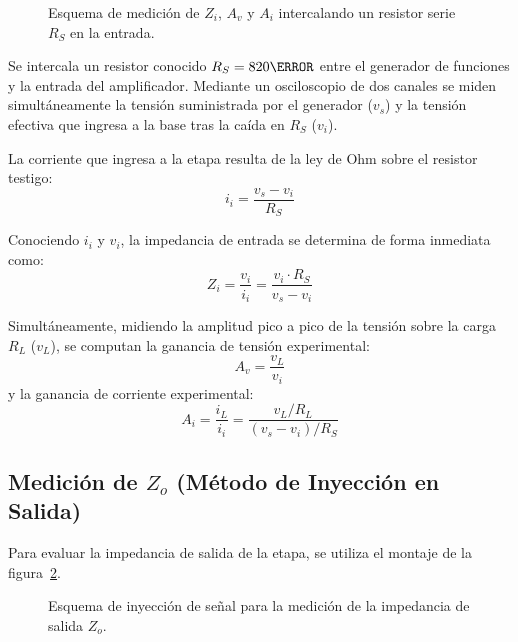 \begin{figure}[!ht]
  \centering
  
  \caption{Esquema de medición de $Z_i$, $A_v$ y $A_i$ intercalando un resistor serie $R_S$ en la entrada.}
  \label{crkt:medicion_zi}
\end{figure}

Se intercala un resistor conocido $R_S = 820\ohm$ entre el generador de funciones y la entrada del amplificador.
Mediante un osciloscopio de dos canales se miden simultáneamente la tensión suministrada por el generador ($v_s$) y la
tensión efectiva que ingresa a la base tras la caída en $R_S$ ($v_i$).

La corriente que ingresa a la etapa resulta de la ley de Ohm sobre el resistor testigo:
\begin{equation}
  i_i = \frac{v_s - v_i}{R_S}
  \label{eq:ii_exp}
\end{equation}

Conociendo $i_i$ y $v_i$, la impedancia de entrada se determina de forma inmediata como:
\begin{equation}
  Z_i = \frac{v_i}{i_i} = \frac{v_i \cdot R_S}{v_s - v_i}
  \label{eq:Zi_exp_formula}
\end{equation}

Simultáneamente, midiendo la amplitud pico a pico de la tensión sobre la carga $R_L$ ($v_L$), se computan la ganancia
de tensión experimental:
\begin{equation}
  A_v = \frac{v_L}{v_i}
  \label{eq:Av_exp_formula}
\end{equation}
y la ganancia de corriente experimental:
\begin{equation}
  A_i = \frac{i_L}{i_i} = \frac{v_L / R_L}{(v_s - v_i) / R_S}
  \label{eq:Ai_exp_formula}
\end{equation}

\subsection{Medición de \texorpdfstring{$Z_o$}{Zo} (Método de Inyección en Salida)}
Para evaluar la impedancia de salida de la etapa, se utiliza el montaje de la figura~\ref{crkt:medicion_zo}.

\begin{figure}[!ht]
  \centering
  
  \caption{Esquema de inyección de señal para la medición de la impedancia de salida $Z_o$.}
  \label{crkt:medicion_zo}
\end{figure}

